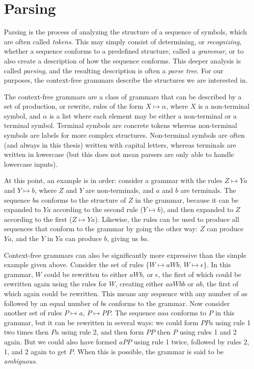 
\chapter{Parsing} \label{Parsing}

	Parsing is the process of analyzing the structure of a sequence of symbols,
	which are often called \emph{tokens}. This may simply consist of
	determining, or \emph{recognizing}, whether a sequence conforms to a
	predefined structure, called a \emph{grammar}, or to also create a
	description of how the sequence conforms. This deeper analysis is called
	\emph{parsing}, and the resulting description is often a \emph{parse tree}.
	For our purposes, the context-free grammars describe the structures we are
	interested in.

	The context-free grammars are a class of grammars that can be described by
	a set of production, or rewrite, rules of the form $X \mapsto \alpha$,
	where $X$ is a non-terminal symbol, and $\alpha$ is a list where each
	element may be either a non-terminal or a terminal symbol. Terminal symbols
	are concrete tokens whereas non-terminal symbols are labels for more
	complex structures.  Non-terminal symbols are often (and always in this
	thesis) written with capital letters, whereas terminals are written in
	lowercase (but this does not mean parsers are only able to handle lowercase
	inputs).

	At this point, an example is in order: consider a grammar with the rules $Z
	\mapsto Ya$ and $Y \mapsto b$, where $Z$ and $Y$ are non-terminals, and $a$
	and $b$ are terminals.  The sequence $ba$ conforms to the structure of $Z$
	in the grammar, because it can be expanded to $Ya$ according to the second
	rule ($Y \mapsto b$), and then expanded to $Z$ according to the first ($Z
	\mapsto Ya$).  Likewise, the rules can be used to produce all sequences
	that conform to the grammar by going the other way: $Z$ can produce $Ya$,
	and the $Y$ in $Ya$ can produce $b$, giving us $ba$.

	Context-free grammars can also be significantly more expressive than the
	simple example given above. Consider the set of rules $\{W \mapsto aWb$, $W
	\mapsto \epsilon\}$. In this grammar, $W$ could be rewritten to either
	$aWb$, or $\epsilon$, the first of which could be rewritten again using the
	rules for $W$, creating either $aaWbb$ or $ab$, the first of which again
	could be rewritten. This means any sequence with any number of $a$s
	followed by an equal number of $b$s conforms to the grammar. Now consider
	another set of rules {$P \mapsto a$, $P \mapsto PP$}. The sequence $aaa$
	conforms to $P$ in this grammar, but it can be rewritten in several ways:
	we could form $PPa$ using rule 1 two times then $Pa$ using rule 2, and then
	form $PP$ then $P$ using rules 1 and 2 again. But we could also have formed
	$aPP$ using rule 1 twice, followed by rules 2, 1, and 2 again to get $P$.
	When this is possible, the grammar is said to be \emph{ambiguous}.

